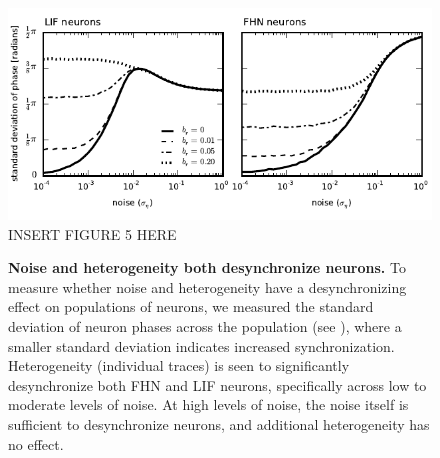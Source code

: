 \documentclass[letterpaper,11pt]{article}
\begin{document}
\begin{figure}
  \ifx\hidefigures\undefined
    \centering
    \includegraphics[width=\textwidth]{figure5_phase.pdf}
  \else
    INSERT FIGURE 5 HERE
  \fi
  \caption{
    \textbf{Noise and heterogeneity both desynchronize neurons.} To measure whether noise and heterogeneity have a desynchronizing effect on populations of neurons, we measured the standard deviation of neuron phases across the population (see \textsc{}), where a smaller standard deviation indicates increased synchronization. Heterogeneity (individual traces) is seen to significantly desynchronize both FHN and LIF neurons, specifically across low to moderate levels of noise. At high levels of noise, the noise itself is sufficient to desynchronize neurons, and additional heterogeneity has no effect.
  }
  \label{fig:phase}
\end{figure}
\end{document}

